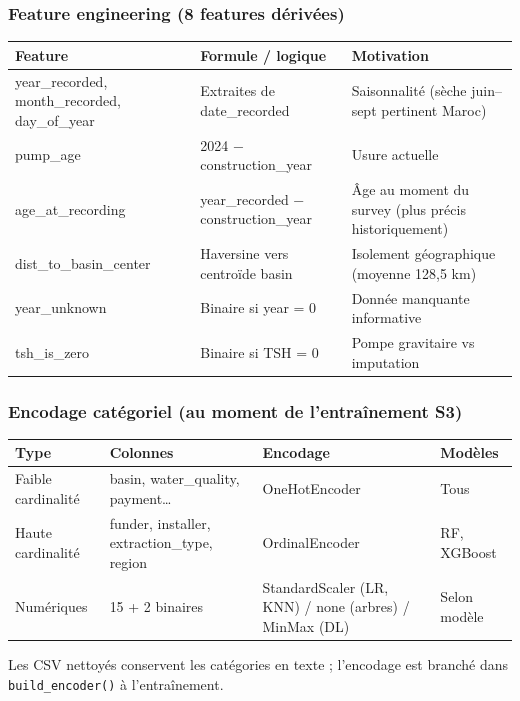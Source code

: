 \documentclass[11pt,a4paper]{report}
\begin{document}
\subsubsection{Feature engineering (8 features dérivées)}



\begin{longtable}{@{}lll@{}}
\toprule
Feature & Formule / logique & Motivation \\
\midrule
year\_recorded, month\_recorded, day\_of\_year & Extraites de date\_recorded & Saisonnalité (sèche juin–sept pertinent Maroc) \\
pump\_age & 2024 − construction\_year & Usure actuelle \\
age\_at\_recording & year\_recorded − construction\_year & Âge au moment du survey (plus précis historiquement) \\
dist\_to\_basin\_center & Haversine vers centroïde basin & Isolement géographique (moyenne 128,5 km) \\
year\_unknown & Binaire si year = 0 & Donnée manquante informative \\
tsh\_is\_zero & Binaire si TSH = 0 & Pompe gravitaire vs imputation \\
\bottomrule
\end{longtable}




\subsubsection{Encodage catégoriel (au moment de l'entraînement S3)}



\begin{longtable}{@{}llll@{}}
\toprule
Type & Colonnes & Encodage & Modèles \\
\midrule
Faible cardinalité & basin, water\_quality, payment… & OneHotEncoder & Tous \\
Haute cardinalité & funder, installer, extraction\_type, region & OrdinalEncoder & RF, XGBoost \\
Numériques & 15 + 2 binaires & StandardScaler (LR, KNN) / none (arbres) / MinMax (DL) & Selon modèle \\
\bottomrule
\end{longtable}




Les CSV nettoyés conservent les catégories en texte ; l'encodage est branché dans \texttt{build\_encoder()} à l'entraînement.
\end{document}

